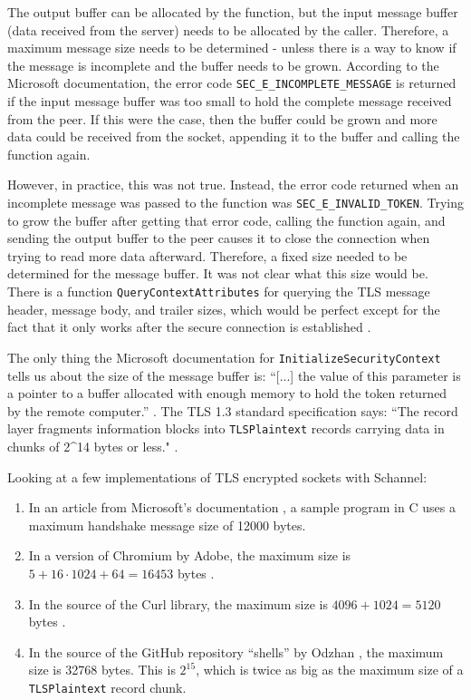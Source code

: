 \documentclass[12pt, a4paper]{article}
\begin{document}
The output buffer can be allocated by the function, but the input message buffer (data received from the server) needs to be allocated by the caller. Therefore, a maximum message size needs to be determined - unless there is a way to know if the message is incomplete and the buffer needs to be grown. According to the Microsoft documentation, the error code \texttt{SEC\_E\_INCOMPLETE\_MESSAGE} is returned if the input message buffer was too small to hold the complete message received from the peer. If this were the case, then the buffer could be grown and more data could be received from the socket, appending it to the buffer and calling the function again.

However, in practice, this was not true. Instead, the error code returned when an incomplete message was passed to the function was \texttt{SEC\_E\_INVALID\_TOKEN}. Trying to grow the buffer after getting that error code, calling the function again, and sending the output buffer to the peer causes it to close the connection when trying to read more data afterward. Therefore, a fixed size needed to be determined for the message buffer. It was not clear what this size would be. There is a function \texttt{QueryContextAttributes} for querying the TLS message header, message body, and trailer sizes, which would be perfect except for the fact that it only works after the secure connection is established \parencite{MicrosoftQueryContextAttributes}. 

The only thing the Microsoft documentation for \texttt{InitializeSecurityContext} tells us about the size of the message buffer is: “[...] the value of this parameter is a pointer to a buffer allocated with enough memory to hold the token returned by the remote computer.” \parencite{MicrosoftInitializeSecurityContext}. The TLS 1.3 standard specification says: “The record layer fragments information blocks into \texttt{TLSPlaintext} records carrying data in chunks of 2\^{}14 bytes or less." \parencite[][p. 78]{TlsSpec}. 

Looking at a few implementations of TLS encrypted sockets with Schannel:
\begin{enumerate}
	\item In an article from Microsoft’s documentation \parencite*{SchannelUsageMicrosoft}, a sample program in C uses a maximum handshake message size of 12000 bytes.
	\item In a version of Chromium by Adobe, the maximum size is $5+16\cdot1024+64=16453$ bytes \parencite{SchannelUsageChromium}.
	\item In the source of the Curl library, the maximum size is $4096+1024=5120$ bytes \parencite{SchannelUsageLibcurl}.
	\item In the source of the GitHub repository “shells” by Odzhan \parencite*{SchannelUsageOdzhanRepo}, the maximum size is 32768 bytes. This is $2^{15}$, which is twice as big as the maximum size of a \texttt{TLSPlaintext} record chunk.
\end{enumerate}
\end{document}
